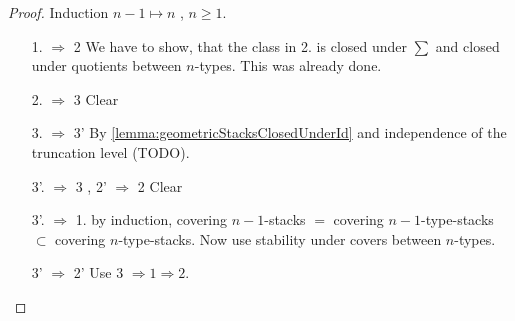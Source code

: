 \begin{proof}
	Induction $n-1 \mapsto n$ , $n \ge 1$.
	\begin{enumerate}
		\item[1. $\Rightarrow$ 2] We have to show, that the class in 2. is closed under $\sum$ and closed under quotients between $n$-types. This was already done.
		\item [2. $\Rightarrow$ 3] Clear
		\item [3. $\Rightarrow$ 3'] By  \ref{lemma:geometricStacksClosedUnderId} and independence of the truncation level (TODO).
		\item [3'. $\Rightarrow$ 3 , 2' $\Rightarrow$ 2] Clear
		
		\item [3'. $\Rightarrow$ 1.]  by induction, covering $n-1$-stacks $=$ covering $n-1$-type-stacks $\subset$ covering $n$-type-stacks. Now use stability under covers between $n$-types.
		\item [3' $\Rightarrow$ 2'] Use 3 $\Rightarrow 1 \Rightarrow 2$.
	\end{enumerate}
\end{proof}
